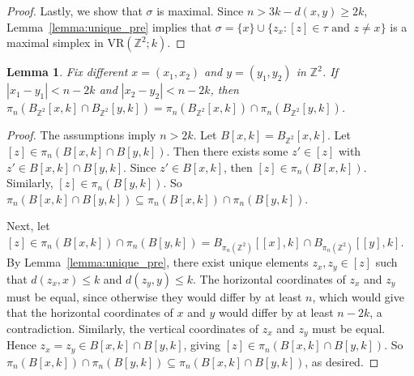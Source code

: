\documentclass[12pt,a4paper]{amsart}
\newtheorem{lemma}[theorem]{Lemma}
\theoremstyle{definition}
\newcommand{\Z}{\ensuremath{\mathbb{Z}}}
\newcommand{\vr}[2]{\mathrm{VR}(#1;#2)}
\newcommand{\note}[1]{\textcolor{blue}{({#1})}}
\numberwithin{equation}{section}
\begin{document}
\begin{proof}
Lastly, we show that $\sigma$ is maximal.
Since $n> 3k-d(x,y) \ge 2k$, Lemma~\ref{lemma:unique_pre} implies that $\sigma=\{x\}\cup \{z_x: [z]\in \tau \text{ and } z\neq x\}$ is a maximal simplex in $\vr{\Z^2}{k}$.
\end{proof}

\begin{lemma}
\label{lemma:emptyintersection} 
Fix different $x=(x_1,x_2)$ and $y=(y_1,y_2)$ in $\Z^2$.
If $|x_1-y_1|<n-2k$ and $|x_2-y_2|<n-2k$, then $\pi_n (B_{\Z^2}[x,k]\cap B_{\Z^2}[y,k]) =\pi_n(B_{\Z^2}[x,k]) \cap \pi_n(B_{\Z^2}[y,k])$.
\end{lemma}

\begin{proof}
The assumptions imply $n>2k$.
Let $B[x,k]=B_{\Z^2}[x,k]$.
Let $[z]\in \pi_n(B[x,k]\cap B[y,k])$.
Then there exists some $z'\in[z]$ with $z'\in B[x,k]\cap B[y,k]$.
Since $z'\in B[x,k]$, then $[z]\in \pi_n(B[x,k])$.
Similarly, $[z]\in \pi_n(B[y,k])$.
So $\pi_n(B[x,k]\cap B[y,k])\subseteq\pi_n(B[x,k]) \cap \pi_n(B[y,k])$.

Next, let $[z]\in\pi_n(B[x,k]) \cap \pi_n(B[y,k])=B_{\pi_n(\Z^2)}[[x],k]\cap B_{\pi_n(\Z^2)}[[y],k]$.
By Lemma~\ref{lemma:unique_pre}, there exist unique elements $z_x, z_y\in[z]$ such that $d(z_x, x)\leq k$ and $d(z_y,y)\leq k$.
The horizontal coordinates of $z_x$ and $z_y$ must be equal, since otherwise they would differ by at least $n$, which would give that the horizontal coordinates of $x$ and $y$ would differ by at least $n-2k$, a contradiction.
Similarly, the vertical coordinates of $z_x$ and $z_y$ must be equal.
Hence $z_x=z_y\in B[x,k]\cap B[y,k]$, giving $[z]\in \pi_n(B[x,k]\cap B[y,k])$.
So $\pi_n(B[x,k]) \cap \pi_n(B[y,k])\subseteq \pi_n (B[x,k]\cap B[y,k])$, as desired.
\end{proof}

\end{document}
